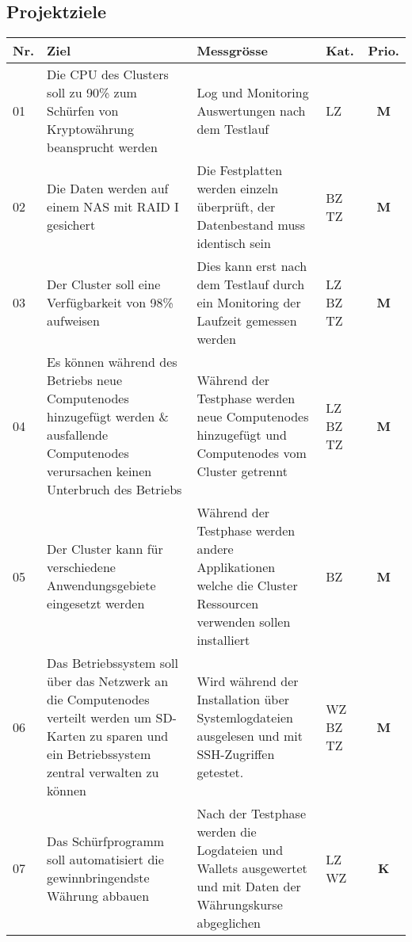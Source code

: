 \newpage
\subsection{Projektziele} 
\label{sec:Projektziele}

\begin{table}[H]
\begin{tabular}[t]{p{0.7cm}|p{6.1cm}p{6.1cm} >{\centering}p{0.6cm}c}
\hline
\rowcolor{heading}\textbf{Nr.} & \textbf{Ziel} & \textbf{Messgrösse} & \textbf{Kat.} & \textbf{Prio.} \\\hline
01 & Die CPU des Clusters soll zu 90\% zum Schürfen von Kryptowährung  beansprucht werden & Log und Monitoring Auswertungen nach dem Testlauf & LZ & \textbf{M} \\\hline
02 & Die Daten werden auf einem NAS mit RAID I gesichert & Die Festplatten werden einzeln überprüft, der Datenbestand muss identisch sein & BZ \newline TZ & \textbf{M} \\\hline
03 & Der Cluster soll eine Verfügbarkeit von 98\% aufweisen & Dies kann erst nach dem Testlauf durch ein Monitoring der Laufzeit gemessen werden & LZ \newline BZ \newline TZ & \textbf{M} \\\hline
04 & Es können während des Betriebs neue Computenodes hinzugefügt werden \& ausfallende Computenodes verursachen keinen Unterbruch des Betriebs & Während der Testphase werden neue Computenodes hinzugefügt und Computenodes vom Cluster getrennt  & LZ \newline BZ \newline TZ & \textbf{M} \\\hline 
05 & Der Cluster kann für verschiedene Anwendungsgebiete eingesetzt werden & Während der Testphase werden andere Applikationen welche die Cluster Ressourcen verwenden sollen installiert & BZ & \textbf{M} \\\hline
06 & Das Betriebssystem soll über das Netzwerk an die Computenodes verteilt werden um SD-Karten zu sparen und ein Betriebssystem zentral verwalten zu können & Wird während der Installation über Systemlogdateien ausgelesen und mit SSH-Zugriffen getestet. & WZ \newline BZ \newline TZ & \textbf{M} \\\hline
07 & Das Schürfprogramm soll automatisiert die gewinnbringendste Währung abbauen & Nach der Testphase werden die Logdateien und Wallets ausgewertet und mit Daten der Währungskurse abgeglichen & LZ \newline WZ & \textbf{K} \\\hline

\end{tabular}
\end{table}
